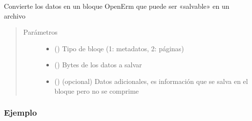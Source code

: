 \documentclass[a4paper,12pt,spanish]{sphinxmanual}
\begin{document}
\begin{fulllineitems}
\begin{fulllineitems}
\end{fulllineitems}


\begin{fulllineitems}
\label{\detokenize{openerm.Block:openerm.Block.Block.dump}}
Convierte los datos en un bloque OpenErm que puede ser «salvable» en un archivo
\begin{quote}\begin{description}
\item[{Parámetros}] \leavevmode\begin{itemize}
\item {} 
 () \textendash{} Tipo de bloqe (1: metadatos, 2: páginas)

\item {} 
 () \textendash{} Bytes de los datos a salvar

\item {} 
 () \textendash{} (opcional) Datos adicionales, es información que se salva en el bloque pero no se comprime

\end{itemize}

\end{description}\end{quote}
\subsubsection*{Ejemplo}


\end{fulllineitems}
\end{fulllineitems}
\end{document}
